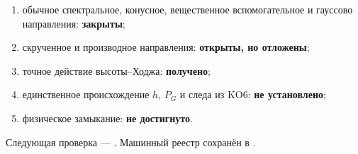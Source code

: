 \begin{protocol}
\begin{enumerate}
 \item обычное спектральное, конусное, вещественное вспомогательное и
 гауссово направления: \textbf{закрыты};
 \item скрученное и производное направления: \textbf{открыты, но отложены};
 \item точное действие высоты--Ходжа: \textbf{получено};
 \item единственное происхождение \(h\), \(P_G\) и следа из KO6:
 \textbf{не установлено};
 \item физическое замыкание: \textbf{не достигнуто}.
\end{enumerate}
\end{protocol}

Следующая проверка --- .
Машинный реестр сохранён в
.